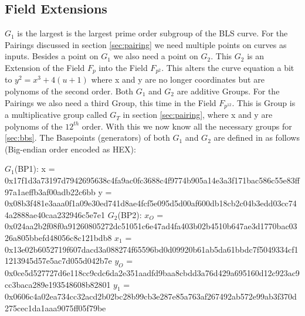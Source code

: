 \documentclass[
	a4paper               %
	,bibliography=totoc   %
	,listof=totoc         %
	,monolingual
	twoside=false,
]{bfhthesis}              %
\begin{document}
\subsection{Field Extensions}
$G_1$ is the largest is the largest prime order subgroup of the BLS curve.
For the Pairings discussed in section \ref{sec:pairing} we need multiple points on curves as inputs.
Besides a point on $G_1$ we also need a point on $G_2$.
This $G_2$ is an Extension of the Field $F_p$ into the Field $F_{p^2}$.
This alters the curve equation a bit to $y^2 = x^3 + 4(u + 1)$ where x and y are no longer coordinates but are polynoms of the second order.
Both $G_1$ and $G_2$ are additive Groups.
For the Pairings we also need a third Group, this time in the Field $F_{p^{12}}$.
This is Group is a multiplicative group called $G_T$ in section \ref{sec:pairing}, where x and y are polynoms of the $12^{th}$ order.
With this we now know all the necessary groups for \ref{sec:bbs}.
The Basepoints (generators) of both $G_1$ and $G_2$ are defined in \cite{pairing-friendly-curves} as follows (Big-endian order encoded as HEX):\newline

\boldmath$G_1$(BP1):\newline
x = 0x17f1d3a73197d7942695638c4fa9ac0fc3688c4f9774b905a14e3a3f171bac586c55e83ff97a1aeffb3af00adb22c6bb
y = 0x08b3f481e3aaa0f1a09e30ed741d8ae4fcf5e095d5d00af600db18cb2c04b3edd03cc744a2888ae40caa232946c5e7e1\newline\newline
\boldmath$G_2$(BP2):\newline
$x_O$ = 0x024aa2b2f08f0a91260805272dc51051c6e47ad4fa403b02b4510b647ae3d1770bac0326a805bbefd48056c8c121bdb8
$x_1$ = 0x13e02b6052719f607dacd3a088274f65596bd0d09920b61ab5da61bbdc7f5049334cf11213945d57e5ac7d055d042b7e
$y_O$ = 0x0ce5d527727d6e118cc9cdc6da2e351aadfd9baa8cbdd3a76d429a695160d12c923ac9cc3baca289e193548608b82801
$y_1$ = 0x0606c4a02ea734cc32acd2b02bc28b99cb3e287e85a763af267492ab572e99ab3f370d275cec1da1aaa9075ff05f79be
\end{document}
